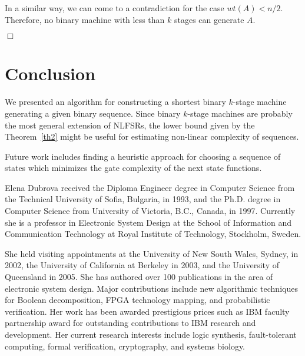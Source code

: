 \documentclass[twocolumn]{IEEEtran} \usepackage{epsfig}
\begin{document}
In a similar way, we can come to a contradiction for the case  $wt(A) < n/2$.
Therefore, no binary machine with less than $k$ stages can generate $A$.
\begin{flushright}
$\Box$
\end{flushright}



\section{Conclusion}

We presented an algorithm for constructing a shortest binary
$k$-stage machine generating a given binary sequence. 
Since binary $k$-stage machines are probably the most general extension of NLFSRs,
the lower bound given by the Theorem~\ref{th2} might be useful for estimating non-linear 
complexity of sequences. 

Future work includes finding a heuristic approach for choosing a sequence of states which 
minimizes the gate complexity of the next state functions.









\begin{biography} []{Elena Dubrova}
received the Diploma Engineer degree in Computer Science from the Technical University of Sofia, Bulgaria, in 1993, and  the Ph.D. degree in Computer Science from University of Victoria, B.C., Canada, in 1997. Currently she is a professor in Electronic System Design at the School of Information and Communication Technology at Royal Institute of Technology, Stockholm, Sweden. 

She held visiting appointments at the University of New South Wales, Sydney, in 2002, the University of California at Berkeley in 2003, and the University of Queensland in 2005. She has authored over 100 publications in the area of electronic system design. Major contributions include new algorithmic techniques for Boolean decomposition, FPGA technology mapping, and probabilistic verification. Her work has been awarded prestigious prices such as IBM faculty partnership award for outstanding contributions to IBM research and development. Her current research interests include logic synthesis, fault-tolerant computing, formal verification, cryptography, and systems biology. 
\end{biography}
\end{document}
